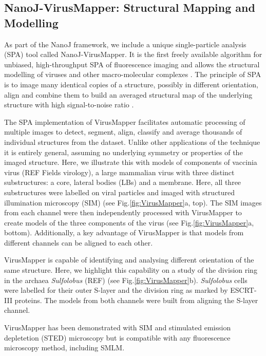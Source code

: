 \subsection*{NanoJ-VirusMapper: Structural Mapping and Modelling}
As part of the NanoJ framework, we include a unique single-particle analysis (SPA) tool called NanoJ-VirusMapper. It is the first freely available algorithm for unbiased, high-throughput SPA of fluorescence imaging and allows the structural modelling of viruses and other macro-molecular complexes \cite{Gray2016,Gray2017}. The principle of SPA is to image many identical copies of a structure, possibly in different orientation, align and combine them to build an averaged structural map of the underlying structure with high signal-to-noise ratio \cite{Szymborska2013,laine2015structural} . 

The SPA implementation of VirusMapper facilitates automatic processing of multiple images to detect, segment, align, classify and average thousands of individual structures from the dataset. Unlike other applications of the technique it is entirely general, assuming no underlying symmetry or properties of the imaged structure. Here, we illustrate this with models of components of vaccinia virus (REF Fields virology), a large mammalian virus with three distinct substructures: a core, lateral bodies (LBs) and a membrane. Here, all three substructures were labelled on viral particles and  imaged with structured illumination microscopy (SIM) \cite{gustafsson2000surpassing} (see Fig.\ref{fig:VirusMapper}a, top). The SIM images from each channel were then independently processed with VirusMapper to create models of the three components of the virus (see Fig.\ref{fig:VirusMapper}a, bottom). Additionally, a key advantage of VirusMapper is that models from different channels can be aligned to each other.

VirusMapper is capable of identifying and analysing different orientation of the same structure. Here, we highlight this capability on a study of the division ring in the archaea \emph{Sulfolobus} (REF) (see Fig.\ref{fig:VirusMapper}b). \emph{Sulfolobus} cells were labelled for their outer S-layer and the division ring as marked by ESCRT-III proteins. The models from both channels were built from aligning the S-layer channel.

VirusMapper has been demonstrated with SIM and stimulated emission depletetion (STED) microscopy \cite{Gray2016} but is compatible with any fluorescence microscopy method, including SMLM.

